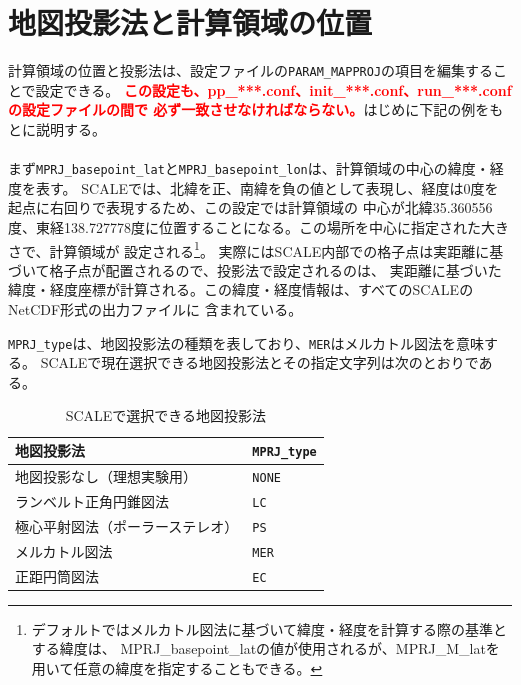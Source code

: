 \section{地図投影法と計算領域の位置} \label{sec:adv_mapproj}
計算領域の位置と投影法は、設定ファイルの\verb|PARAM_MAPPROJ|の項目を編集することで設定できる。
\textcolor{red}{\bf この設定も、pp\_***.conf、init\_***.conf、run\_***.confの設定ファイルの間で
必ず一致させなければならない。}はじめに下記の例をもとに説明する。\\

\\

\noindent まず\verb|MPRJ_basepoint_lat|と\verb|MPRJ_basepoint_lon|は、計算領域の中心の緯度・経度を表す。
SCALEでは、北緯を正、南緯を負の値として表現し、経度は0度を起点に右回りで表現するため、この設定では計算領域の
中心が北緯35.360556度、東経138.727778度に位置することになる。この場所を中心に指定された大きさで、計算領域が
設定される\footnote{デフォルトではメルカトル図法に基づいて緯度・経度を計算する際の基準とする緯度は、
MPRJ\_basepoint\_latの値が使用されるが、MPRJ\_M\_latを用いて任意の緯度を指定することもできる。}。
実際にはSCALE内部での格子点は実距離に基づいて格子点が配置されるので、投影法で設定されるのは、
実距離に基づいた緯度・経度座標が計算される。この緯度・経度情報は、すべてのSCALEのNetCDF形式の出力ファイルに
含まれている。

\verb|MPRJ_type|は、地図投影法の種類を表しており、\verb|MER|はメルカトル図法を意味する。
SCALEで現在選択できる地図投影法とその指定文字列は次のとおりである。

\begin{table}[htb]
\begin{center}
\caption{SCALEで選択できる地図投影法}
\begin{tabularx}{150mm}{|l|X|} \hline
 \rowcolor[gray]{0.9} 地図投影法 & \verb|MPRJ_type| \\ \hline
 地図投影なし（理想実験用）& \verb|NONE| \\ \hline
 ランベルト正角円錐図法 & \verb|LC| \\ \hline
 極心平射図法（ポーラーステレオ） & \verb|PS| \\ \hline
 メルカトル図法 & \verb|MER| \\ \hline
 正距円筒図法 & \verb|EC| \\ \hline
\end{tabularx}
\label{tab:map_proj}
\end{center}
\end{table}


